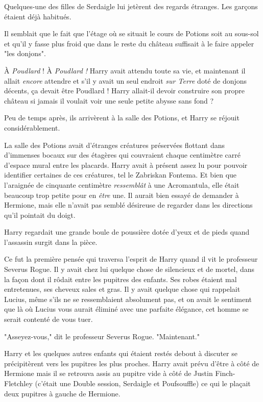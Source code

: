 Quelques-une des filles de Serdaigle lui jetèrent des regards étranges. Les garçons étaient déjà habitués.

Il semblait que le fait que l'étage où se situait le cours de Potions soit au sous-sol et qu'il y fasse plus froid que dans le reste du château suffisait à le faire appeler "les donjons".

À \emph{Poudlard}  ! À \emph{Poudlard !}  Harry avait attendu toute sa vie, et maintenant il allait \emph{encore}  attendre et s'il y avait un seul endroit \emph{sur Terre}  doté de donjons décents, ça devait être Poudlard ! Harry allait-il devoir construire son propre château si jamais il voulait voir une seule petite abysse sans fond ?

Peu de temps après, ils arrivèrent à la salle des Potions, et Harry se réjouit considérablement.

La salle des Potions avait d'étranges créatures préservées flottant dans d'immenses bocaux sur des étagères qui couvraient chaque centimètre carré d'espace mural entre les placards. Harry avait à présent assez lu pour pouvoir identifier certaines de ces créatures, tel le Zabriskan Fontema. Et bien que l'araignée de cinquante centimètre \emph{ressemblât}  à une Acromantula, elle était beaucoup trop petite pour en \emph{être}  une. Il aurait bien essayé de demander à Hermione, mais elle n'avait pas semblé désireuse de regarder dans les directions qu'il pointait du doigt.

Harry regardait une grande boule de poussière dotée d'yeux et de pieds quand l'assassin surgit dans la pièce.

Ce fut la première pensée qui traversa l'esprit de Harry quand il vit le professeur Severus Rogue. Il y avait chez lui quelque chose de silencieux et de mortel, dans la façon dont il rôdait entre les pupitres des enfants. Ses robes étaient mal entretenues, ses cheveux sales et gras. Il y avait quelque chose qui rappelait Lucius, même s'ils ne se ressemblaient absolument pas, et on avait le sentiment que là où Lucius vous aurait éliminé avec une parfaite élégance, cet homme se serait contenté de vous tuer.

"Asseyez-vous," dit le professeur Severus Rogue. "Maintenant."

Harry et les quelques autres enfants qui étaient restés debout à discuter se précipitèrent vers les pupitres les plus proches. Harry avait prévu d'être à côté de Hermione mais il se retrouva assis au pupitre vide à côté de Justin Finch-Fletchley (c'était une Double session, Serdaigle et Poufsouffle) ce qui le plaçait deux pupitres à gauche de Hermione.

